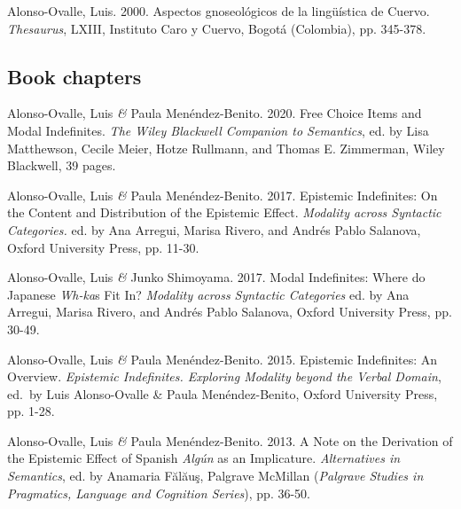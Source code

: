 \documentclass[11pt]{article}
\begin{document}
Alonso-Ovalle, Luis. 2000. Aspectos gnoseol\'ogicos de la ling\"u\'istica de Cuervo. \textit{Thesaurus}, LXIII, Instituto Caro y Cuervo, Bogot\'a (Colombia), pp. 345-378. 



\subsection*{Book chapters} 

Alonso-Ovalle, Luis \textit{\&} Paula Men\'endez-Benito. 2020. Free Choice Items and Modal Indefinites. \textit{The Wiley Blackwell Companion to Semantics}, ed. by Lisa Matthewson, Cecile Meier, Hotze Rullmann, and Thomas E. Zimmerman, Wiley Blackwell, 39 pages. %

Alonso-Ovalle, Luis \textit{\&} Paula Men\'endez-Benito. 2017. Epistemic Indefinites: On the Content and Distribution of the Epistemic Effect. \textit{Modality across Syntactic Categories.} ed. by Ana Arregui, Marisa Rivero, and Andr\'es Pablo Salanova, Oxford University Press, pp. 11-30.

Alonso-Ovalle, Luis \textit{\&} Junko Shimoyama. 2017. Modal Indefinites: Where do Japanese \textit{Wh-ka}s Fit In? \textit{Modality across Syntactic Categories} ed. by Ana Arregui, Marisa Rivero, and Andr\'es Pablo Salanova, Oxford University Press,  pp. 30-49.

Alonso-Ovalle, Luis \textit{\&} Paula Men\'endez-Benito. 2015. Epistemic Indefinites: An Overview. \textit{Epistemic Indefinites. Exploring Modality beyond the Verbal Domain}, ed.\ by Luis Alonso-Ovalle \& Paula Men\'endez-Benito, Oxford University Press, pp. 1-28.

Alonso-Ovalle, Luis \textit{\&} Paula Men\'endez-Benito. 2013. A Note on the Derivation of the Epistemic Effect of Spanish
\textit{Alg\'un} as an Implicature. \textit{Alternatives in Semantics}, ed. by
Anamaria F\u{a}l\u{a}u\c{s}, Palgrave McMillan (\textit{Palgrave
  Studies in Pragmatics, Language and Cognition Series}), pp. 36-50.
\end{document}
